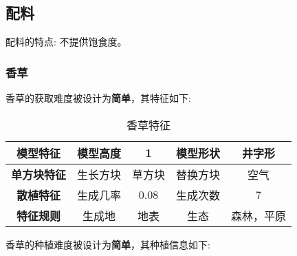 \subsection{配料}

配料的特点: 不提供饱食度。

\subsubsection{香草}

香草的获取难度被设计为\textbf{简单}，其特征如下:
\begin{table}[H]
    \centering
    \caption{香草特征}
    \label{table:香草特征}
    \setlength{\tabcolsep}{4mm}
    \begin{tabular}{c|cc|cc}
        \toprule
        \textbf{模型特征}   & 模型高度 & 1      & 模型形状 & 井字形     \\
        \midrule
        \textbf{单方块特征} & 生长方块 & 草方块 & 替换方块 & 空气       \\
        \midrule
        \textbf{散植特征}   & 生成几率 & 0.08   & 生成次数 & 7          \\
        \midrule
        \textbf{特征规则}   & 生成地   & 地表   & 生态     & 森林，平原 \\
        \bottomrule
    \end{tabular}
\end{table}


香草的种植难度被设计为\textbf{简单}，其种植信息如下:

